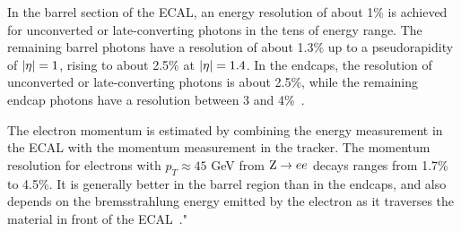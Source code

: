In the barrel section of the ECAL, an energy resolution of about 1\% is achieved for unconverted or late-converting photons in the tens of \GeV energy range. The remaining barrel photons have a resolution of about 1.3\% up to a pseudorapidity of $\lvert \eta \rvert = 1$, rising to about 2.5\% at $\lvert \eta \rvert = 1.4$. In the endcaps, the resolution of unconverted or late-converting photons is about 2.5\%, while the remaining endcap photons have a resolution between 3 and 4\%~\cite{CMS:EGM-14-001}.

The electron momentum is estimated by combining the energy measurement in the ECAL with the momentum measurement in the tracker. The momentum resolution for electrons with $p_T \approx 45$ GeV from $\mathrm{Z} \rightarrow ee$ decays ranges from 1.7\% to 4.5\%. It is generally better in the barrel region than in the endcaps, and also depends on the bremsstrahlung energy emitted by the electron as it traverses the material in front of the ECAL~\cite{Khachatryan:2015hwa}."
